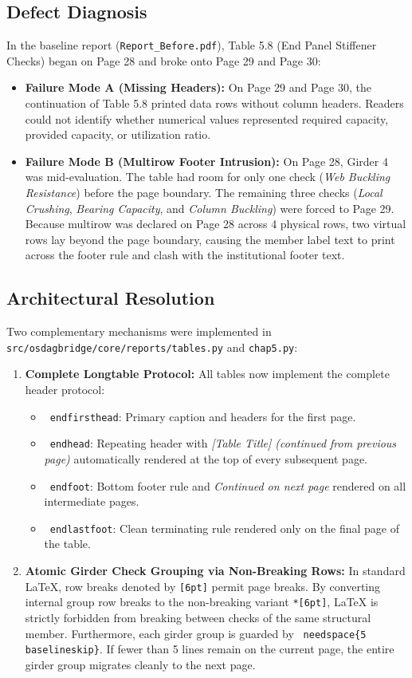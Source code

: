 \documentclass[12pt,a4paper]{article}
\begin{document}
\subsection{Defect Diagnosis}
In the baseline report (\nolinkurl{Report_Before.pdf}), Table 5.8 (End Panel Stiffener Checks) began on Page 28 and broke onto Page 29 and Page 30:
\begin{itemize}
  \item \textbf{Failure Mode A (Missing Headers):} On Page 29 and Page 30, the continuation of Table 5.8 printed data rows without column headers. Readers could not identify whether numerical values represented required capacity, provided capacity, or utilization ratio.
  \item \textbf{Failure Mode B (Multirow Footer Intrusion):} On Page 28, Girder 4 was mid-evaluation. The table had room for only one check (\textit{Web Buckling Resistance}) before the page boundary. The remaining three checks (\textit{Local Crushing}, \textit{Bearing Capacity}, and \textit{Column Buckling}) were forced to Page 29. Because multirow was declared on Page 28 across 4 physical rows, two virtual rows lay beyond the page boundary, causing the member label text to print across the footer rule and clash with the institutional footer text.
\end{itemize}

\subsection{Architectural Resolution}
Two complementary mechanisms were implemented in \nolinkurl{src/osdagbridge/core/reports/tables.py} and \nolinkurl{chap5.py}:
\begin{enumerate}
  \item \textbf{Complete Longtable Protocol:} All tables now implement the complete header protocol:
    \begin{itemize}
      \item \texttt{ endfirsthead}: Primary caption and headers for the first page.
      \item \texttt{ endhead}: Repeating header with \textit{[Table Title] (continued from previous page)} automatically rendered at the top of every subsequent page.
      \item \texttt{ endfoot}: Bottom footer rule and \textit{Continued on next page} rendered on all intermediate pages.
      \item \texttt{ endlastfoot}: Clean terminating rule rendered only on the final page of the table.
    \end{itemize}
  \item \textbf{Atomic Girder Check Grouping via Non-Breaking Rows:}
    In standard LaTeX, row breaks denoted by \texttt{[6pt]} permit page breaks. By converting internal group row breaks to the non-breaking variant \texttt{*[6pt]}, LaTeX is strictly forbidden from breaking between checks of the same structural member. Furthermore, each girder group is guarded by \texttt{ needspace\{5 baselineskip\}}. If fewer than 5 lines remain on the current page, the entire girder group migrates cleanly to the next page.
\end{enumerate}
\end{document}
